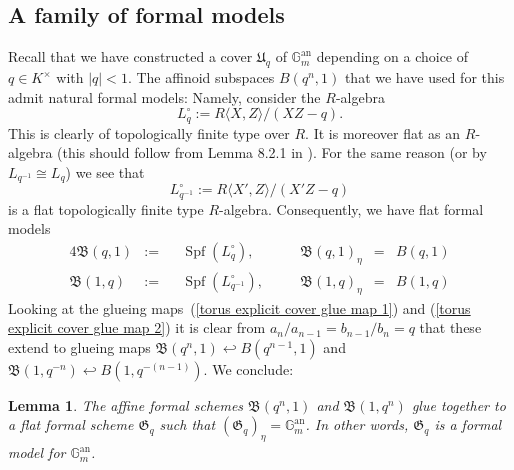 \documentclass[11pt,oneside]{amsart}
\newtheorem{lemma}[theorem]{Lemma}
\theoremstyle{definition}
\theoremstyle{remark}
\begin{document}
	\subsection{A family of formal models}
	Recall that we have constructed a cover $\mathfrak U_q$ of $\mathbb G_m^{\operatorname{an}}$ depending on a choice of $q\in K^\times$ with $|q|<1$. The affinoid subspaces $B(q^n,1)$ that we have used for this admit natural formal models: Namely, consider the $R$-algebra
	\[L_q^\circ := R\langle X,Z\rangle/(XZ-q).\]
	This is clearly of topologically finite type over $R$. It is moreover flat as an $R$-algebra (this should follow from Lemma 8.2.1 in \cite{Bosch lectures}). For the same reason (or by $L_{q^{-1}} \cong L_q$) we see that \[L_{q^{-1}}^\circ := R\langle X',Z\rangle/(X'Z-q)\] is a flat topologically finite type $R$-algebra. Consequently, we have flat formal models 
	\begin{alignat*}{4}
		\mathfrak B(q,1)&:=&& \operatorname{Spf}(L_{q}^\circ), &\quad&\mathfrak B(q,1)_\eta &=& B(q,1)\\ 
		\mathfrak B(1,q)&:=&& \operatorname{Spf}(L_{q^{-1}}^\circ), &\quad&\mathfrak B(1,q)_\eta &=& B(1,q)
	\end{alignat*}
	Looking at the glueing maps~(\ref{torus explicit cover glue map 1}) and (\ref{torus explicit cover glue map 2}) it is clear from $a_n/a_{n-1} = b_{n-1}/b_n = q$ that these extend to glueing maps $\mathfrak B(q^n,1)\hookleftarrow B(q^{n-1},1)$ and $\mathfrak B(1,q^{-n})\hookleftarrow B(1,q^{-(n-1)})$. We conclude:

	\begin{lemma}\label{formal model of torus}
		The affine formal schemes $\mathfrak B(q^n,1)$ and $\mathfrak B(1,q^n)$ glue together to a flat formal scheme $\mathfrak G_q$ such that $(\mathfrak G_q)_\eta = \mathbb G_m^{\operatorname{an}}$. In other words, $\mathfrak G_q$ is a formal model for $\mathbb G_m^{\operatorname{an}}$.
	\end{lemma}
\end{document}
